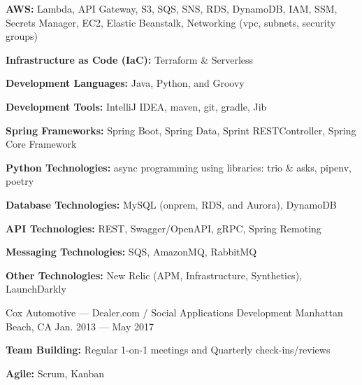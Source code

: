\vspace{-2.00mm}
\begin{cventries}

    {} %
    {} %
    {} %
    {%
      \begin{cvitems} %
        \item {\textbf{AWS:} Lambda, API Gateway, S3, SQS, SNS, RDS, DynamoDB, IAM, SSM, Secrets Manager, EC2, Elastic Beanstalk, Networking (vpc, subnets, security groups)}
        \item {\textbf{Infrastructure as Code (IaC):} Terraform \& Serverless}
        \item {\textbf{Development Languages:} Java, Python, and Groovy}
        \item {\textbf{Development Tools:} IntelliJ IDEA, maven, git, gradle, Jib}
        \item {\textbf{Spring Frameworks:} Spring Boot, Spring Data, Sprint RESTController, Spring Core Framework}
        \item {\textbf{Python Technologies:} async programming using libraries: trio \& asks, pipenv, poetry}
        \item {\textbf{Database Technologies:} MySQL (onprem, RDS, and Aurora), DynamoDB}
        \item {\textbf{API Technologies:} REST, Swagger/OpenAPI, gRPC, Spring Remoting}
        \item {\textbf{Messaging Technologies:} SQS, AmazonMQ, RabbitMQ}
        \item {\textbf{Other Technologies:} New Relic (APM, Infrastructure, Synthetics), LaunchDarkly}
      \end{cvitems}
    }


    {Cox Automotive --- Dealer.com / Social Applications Development} %
    {Manhattan Beach, CA} %
    {Jan. 2013 --- May 2017} %
    {}
    \vspace{-6.00mm}

    {} %
    {} %
    {} %
    {\vspace{-0.5mm}
      \begin{cvitems} %
        \item {\textbf{Team Building:} Regular 1-on-1 meetings and Quarterly check-ins/reviews}
        \item {\textbf{Agile:} Scrum, Kanban}
      \end{cvitems}
    }


\end{cventries}
